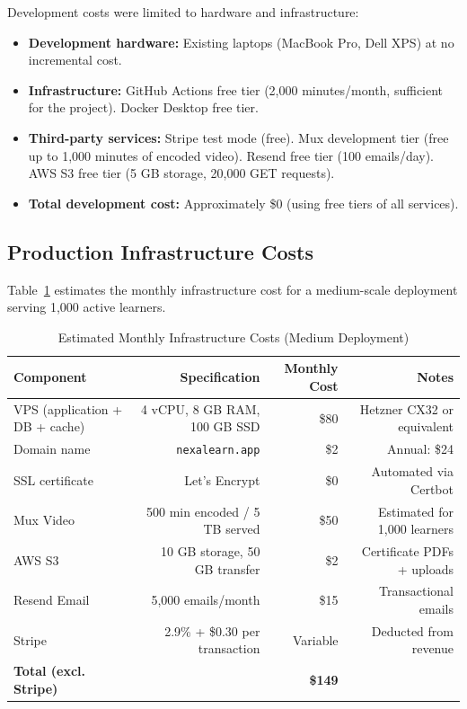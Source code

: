 Development costs were limited to hardware and infrastructure:

\begin{itemize}
  \item \textbf{Development hardware:} Existing laptops (MacBook Pro, Dell XPS) at no incremental cost.
  \item \textbf{Infrastructure:} GitHub Actions free tier (2,000 minutes/month, sufficient for the project). Docker Desktop free tier.
  \item \textbf{Third-party services:} Stripe test mode (free). Mux development tier (free up to 1,000 minutes of encoded video). Resend free tier (100 emails/day). AWS S3 free tier (5 GB storage, 20,000 GET requests).
  \item \textbf{Total development cost:} Approximately \$0 (using free tiers of all services).
\end{itemize}

\subsection{Production Infrastructure Costs}

Table~\ref{tab:app-infra-cost} estimates the monthly infrastructure cost for a medium-scale deployment serving 1,000 active learners.

\begin{table}[H]
  \centering
  \caption{Estimated Monthly Infrastructure Costs (Medium Deployment)}\label{tab:app-infra-cost}
  \small
  \begin{tabular}{lrrr}
    \toprule
    \textbf{Component} & \textbf{Specification} & \textbf{Monthly Cost} & \textbf{Notes} \\
    \midrule
    VPS (application + DB + cache) & 4 vCPU, 8 GB RAM, 100 GB SSD & \$80 & Hetzner CX32 or equivalent \\
    Domain name                    & \texttt{nexalearn.app}          & \$2  & Annual: \$24                \\
    SSL certificate                & Let's Encrypt                   & \$0  & Automated via Certbot       \\
    Mux Video                      & 500 min encoded / 5 TB served  & \$50 & Estimated for 1,000 learners\\
    AWS S3                         & 10 GB storage, 50 GB transfer   & \$2  & Certificate PDFs + uploads  \\
    Resend Email                   & 5,000 emails/month             & \$15 & Transactional emails        \\
    Stripe                         & 2.9\% + \$0.30 per transaction  & Variable & Deducted from revenue  \\
    \midrule
    \textbf{Total (excl. Stripe)}  &                                & \textbf{\$149} & \\
    \bottomrule
  \end{tabular}
\end{table}

